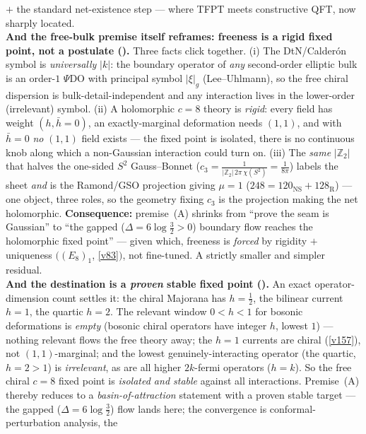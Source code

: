 \documentclass[11pt,a4paper]{article}
\newcommand{\cthree}{c_3}
\newcommand{\Z}{\mathbb Z}
\begin{document}
\begin{keybox}
$+$ the standard net-existence step --- where TFPT meets constructive QFT, now sharply located.
\smallskip\\
\noindent\textbf{And the free-bulk premise itself reframes: freeness is a rigid fixed point, not a postulate
().} Three facts click together. (i) The DtN/Calder\'on symbol is
\emph{universally} $|k|$: the boundary operator of \emph{any} second-order elliptic bulk is an order-$1$
$\Psi$DO with principal symbol $|\xi|_g$ (Lee--Uhlmann), so the free chiral dispersion is
bulk-detail-independent and any interaction lives in the lower-order (irrelevant) symbol. (ii) A holomorphic
$c{=}8$ theory is \emph{rigid}: every field has weight $(h,\bar h{=}0)$, an exactly-marginal deformation
needs $(1,1)$, and with $\bar h{=}0$ \emph{no} $(1,1)$ field exists --- the fixed point is isolated, there is
no continuous knob along which a non-Gaussian interaction could turn on. (iii) The \emph{same} $|\Z_2|$ that
halves the one-sided $S^2$ Gauss--Bonnet ($\cthree=\tfrac1{|\Z_2|\,2\pi\,\chi(S^2)}=\tfrac1{8\pi}$) labels
the sheet \emph{and} is the Ramond/GSO projection giving $\mu{=}1$ ($248{=}120_{\mathrm{NS}}{+}128_{\mathrm
R}$) --- one object, three roles, so the geometry fixing $\cthree$ is the projection making the net
holomorphic. \textbf{Consequence:} premise~(A) shrinks from ``prove the seam is Gaussian'' to ``the gapped
($\Delta{=}6\log\tfrac32{>}0$) boundary flow reaches the holomorphic fixed point'' --- given which, freeness
is \emph{forced} by rigidity $+$ uniqueness $((E_8)_1$, \vref{v83}$)$, not fine-tuned. A strictly smaller and
simpler residual.
\smallskip\\
\noindent\textbf{And the destination is a \emph{proven} stable fixed point ().}
An exact operator-dimension count settles it: the chiral Majorana has $h{=}\tfrac12$, the bilinear current
$h{=}1$, the quartic $h{=}2$. The relevant window $0<h<1$ for bosonic deformations is \emph{empty} (bosonic
chiral operators have integer $h$, lowest $1$) --- nothing relevant flows the free theory away; the $h{=}1$
currents are chiral (\vref{v157}), not $(1,1)$-marginal; and the lowest genuinely-interacting operator (the
quartic, $h{=}2{>}1$) is \emph{irrelevant}, as are all higher $2k$-fermi operators ($h{=}k$). So the free
chiral $c{=}8$ fixed point is \emph{isolated and stable} against all interactions. Premise~(A) thereby
reduces to a \emph{basin-of-attraction} statement with a proven stable target --- the gapped
($\Delta{=}6\log\tfrac32$) flow lands here; the convergence is conformal-perturbation analysis, the

\end{keybox}
\end{document}
